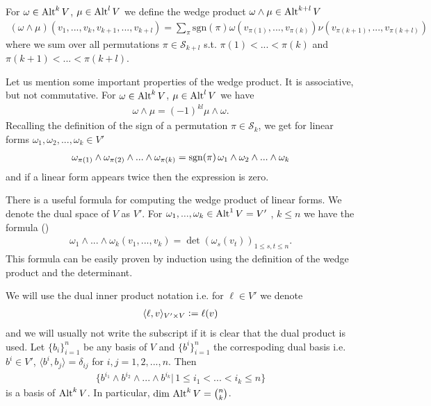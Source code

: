 \documentclass[../master_thesis.tex]{subfiles}
\begin{document}
\begin{definition}
    For $\omega \in 
    {\text{Alt}^{k}\,V}$, $\mu \in 
    {\text{Alt}^{l}\,V}$ we define the wedge product $\omega \wedge \mu \in 
    {\text{Alt}^{k+l}\,V}$ 
    \begin{align*}
        (\omega \wedge \mu) (v_1,...,v_k,v_{k+1},...,v_{k+l}) =
        \sum\limits_\pi
        \text{sgn}(\pi) \omega(v_{\pi(1)},...,v_{\pi(k)}) 
        \nu(v_{\pi(k+1)},...,v_{\pi(k+l)})
    \end{align*}
    where we sum over all permutations 
    $\pi \in \mathcal{S}_{k+l}$ 
    s.t. $\pi(1) < ... < \pi(k)$ and $\pi(k+1) < ... < \pi(k+l)$.        
\end{definition}

Let us mention some important properties of the wedge product. It is 
associative, but not commutative. For $\omega \in 
{\text{Alt}^{k}\,V}$, $\mu \in 
{\text{Alt}^{l}\,V}$ we have 
\begin{align}
    \omega \wedge \mu = (-1)^{kl} \mu \wedge \omega. \label{eq:commutativity_wedge_product}
\end{align}
Recalling the definition of the sign of a permutation $\pi \in \mathcal{S}_k$, 
we get for linear forms $\omega_1, \omega_2, ..., \omega_k \in V'$
\begin{align*}
    \omega_{\pi(1)} \wedge \omega_{\pi(2)} \wedge ... \wedge \omega_{\pi(k)}
    = \operatorname{sgn}(\pi) \, \omega_1 \wedge \omega_2 \wedge ... \wedge \omega_k
\end{align*}
and if a linear form appears twice then the expression is zero.

There is a useful formula for computing the wedge product of linear forms.
We denote the dual space of $V$ as $V'$.
For  $\omega_1,...,\omega_k \in {\text{Alt}^{1}\,V} = V'$
, $k \leq n$ we have the formula (\cite[p.260]{topology_and_geometry})
\begin{align}
    \omega_1 \wedge ... \wedge \omega_k (v_1,...,v_k)
    = \det (\omega_s(v_t))_{1\leq s,t \leq n}. 
    \label{eq:wedge_product_of_one_forms}
\end{align}
This formula can be easily proven by induction using the definition of the 
wedge product and the determinant.

We will use the dual inner product notation i.e. for $\ell \in V'$ we denote 
\begin{align*}
    \langle \ell, v \rangle_{V' \times V} \vcentcolon= \ell (v)
\end{align*}
and we will usually not write the subscript if it is clear that the dual product is used.
Let $\{ b_i\}_{i=1}^n$ be any basis of $V$ and $\{ b^i\}_{i=1}^n$ the 
correspoding dual basis i.e. 
$b^i \in V'$, $\langle b^i, b_j \rangle = \delta_{ij}$ for $i,j = 1,2,..., n$. Then 
\begin{align*}
    \{b^{i_1} \wedge b^{i_2} \wedge ... \wedge b^{i_k} | \, 
    1 \leq i_1 < ... < i_k \leq n \}
\end{align*}
is a basis of ${\text{Alt}^{k}\,V}$. In particular, 
$\dim\, {\text{Alt}^{k}\,V} = \binom{n}{k}$.
\end{document}
